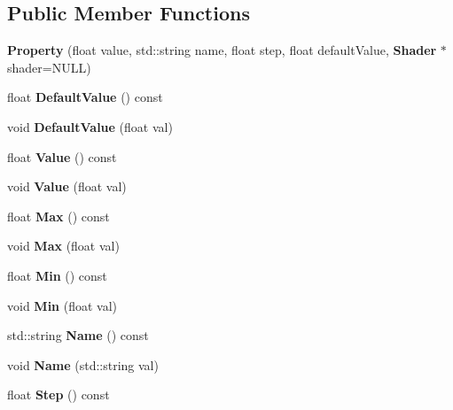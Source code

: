 \subsection*{Public Member Functions}
\begin{DoxyCompactItemize}
\item 
{\bfseries Property} (float value, std\-::string name, float step, float default\-Value, {\bf Shader} $\ast$shader=N\-U\-L\-L)\label{classSoundfieldViewer_1_1Property_ac32d1bf07737c53c596d5e10f867ee5b}

\item 
float {\bfseries Default\-Value} () const \label{classSoundfieldViewer_1_1Property_a3b98271764f68816609f91c541494e2e}

\item 
void {\bfseries Default\-Value} (float val)\label{classSoundfieldViewer_1_1Property_adda16f59b8dce9c51bd51c643786b5e4}

\item 
float {\bfseries Value} () const \label{classSoundfieldViewer_1_1Property_a3199faaa9d6ce46fe158a2ad98a13bc1}

\item 
void {\bfseries Value} (float val)\label{classSoundfieldViewer_1_1Property_a823abd945b8b38ecf709c1c995d3184e}

\item 
float {\bfseries Max} () const \label{classSoundfieldViewer_1_1Property_a208761b1a9fd9e8b121b275d6123b4f4}

\item 
void {\bfseries Max} (float val)\label{classSoundfieldViewer_1_1Property_a84ffed8cc135b333c0a79405c13557c6}

\item 
float {\bfseries Min} () const \label{classSoundfieldViewer_1_1Property_a1d3d619f7de5c6cb5158323293a84880}

\item 
void {\bfseries Min} (float val)\label{classSoundfieldViewer_1_1Property_a6ea2c944c2b7baacde813029a83413ed}

\item 
std\-::string {\bfseries Name} () const \label{classSoundfieldViewer_1_1Property_a1679e000616d742a1e927e392c16216c}

\item 
void {\bfseries Name} (std\-::string val)\label{classSoundfieldViewer_1_1Property_a58c51f519011c9ab4077eab77923e1a4}

\item 
float {\bfseries Step} () const \label{classSoundfieldViewer_1_1Property_a41b7203c074aa8fef67eaa18a95f1c12}


\end{DoxyCompactItemize}
